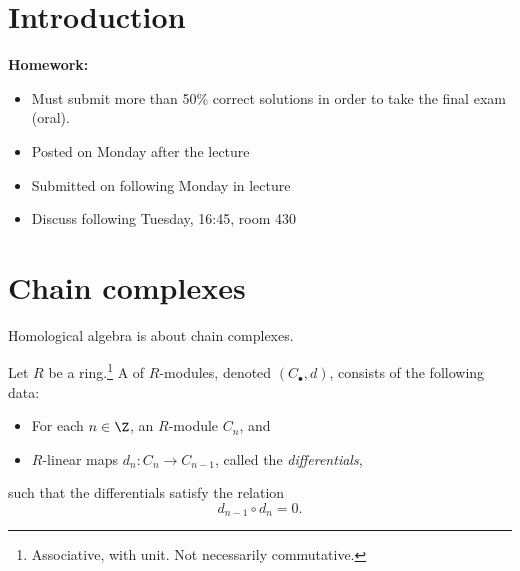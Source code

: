 \documentclass[main.tex]{subfiles}
\begin{document}
\chapter{Introduction}
\label{ch:introduction}

\textbf{Homework:}
\begin{itemize}
  \item Must submit more than 50\% correct solutions in order to take the final exam (oral).

  \item Posted on Monday after the lecture

  \item Submitted on following Monday in lecture

  \item Discuss following Tuesday, 16:45, room 430
\end{itemize}

\chapter{Chain complexes}
\label{ch:chain_complexes}

Homological algebra is about chain complexes.
\begin{definition}
  \label{def:chain_complex}
  Let $R$ be a ring.\footnote{Associative, with unit. Not necessarily commutative.} A  of $R$-modules, denoted $(C_{\bullet}, d)$, consists of the following data:
  \begin{itemize}
    \item For each $n \in \Z$, an $R$-module $C_{n}$, and

    \item $R$-linear maps $d_{n}\colon C_{n} \to C_{n-1}$, called the \emph{differentials},
  \end{itemize}
  such that the differentials satisfy the relation
  \begin{equation*}
    d_{n-1} \circ d_{n} = 0.
  \end{equation*}
\end{definition}
\end{document}
